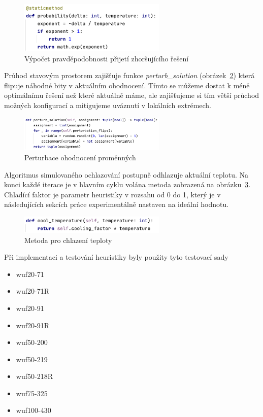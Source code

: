\documentclass[twoside,twocolumn]{article}
\begin{document}
    \begin{figure}
        \centering
        \includegraphics[width=7cm]{images/probabilty}
        \caption{Výpočet pravděpodobnosti přijetí zhoršujícího řešení}
        \label{fig:probabilty}
    \end{figure}

    Průhod stavovým prostorem zajišťuje funkce \emph{perturb\_solution} (obrázek~\ref{fig:perturb}) která flipuje náhodné bity v aktuálním ohodnocení.
    Tímto se můžeme dostat k méně optimálnímu řešení než které aktuálně máme, ale zajišťujeme si tím větší průchod
    možných konfigurací a mitigujeme uváznutí v lokálních extrémech.

    \begin{figure}
        \centering
        \includegraphics[width=7cm]{images/perturb}
        \caption{Perturbace ohodnocení proměnných}
        \label{fig:perturb}
    \end{figure}

    Algoritmus simulovaného ochlazování postupně odhlazuje aktuální teplotu.
    Na konci každé iterace je v hlavním cyklu volána metoda zobrazená na obrázku~\ref{fig:cool}.
    Chladící faktor je parametr heuristiky v rozsahu od 0 do 1, který je v následujících sekcích práce experimentálně nastaven
    na ideální hodnotu.

    \begin{figure}
        \centering
        \includegraphics[width=7cm]{images/cool}
        \caption{Metoda pro chlazení teploty}
        \label{fig:cool}
    \end{figure}

    Při implementaci a testování heuristiky byly použity tyto testovací sady

    \begin{itemize}
        \item wuf20-71
        \item wuf20-71R
        \item wuf20-91
        \item wuf20-91R
        \item wuf50-200
        \item wuf50-219
        \item wuf50-218R
        \item wuf75-325
        \item wuf100-430
    \end{itemize}
\end{document}
